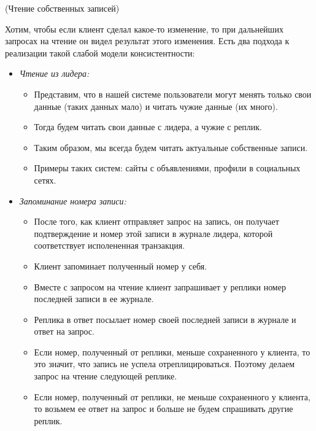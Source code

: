 \begin{example}(Чтение собственных записей)

     Хотим, чтобы если клиент сделал какое-то изменение, то при дальнейших запросах на чтение он видел результат этого изменения. Есть два подхода к реализации такой слабой модели консистентности:
    \begin{itemize}
        \item \textit{Чтение из лидера:}
        \begin{itemize}
            \item Представим, что в нашей системе пользователи могут менять только свои данные (таких данных мало) и читать чужие данные (их много).
            \item Тогда будем читать свои данные с лидера, а чужие с реплик.
            \item Таким образом, мы всегда будем читать актуальные собственные записи.
            \item Примеры таких систем: сайты с объявлениями, профили в социальных сетях.
        \end{itemize}

        \item \textit{Запоминание номера записи:}
        \begin{itemize}
            \item После того, как клиент отправляет запрос на запись, он получает подтверждение и номер этой записи в журнале лидера, которой соответствует исполененная транзакция.
            \item Клиент запоминает полученный номер у себя.
            \item Вместе с запросом на чтение клиент запрашивает у реплики номер последней записи в ее журнале.
            \item Реплика в ответ посылает номер своей последней записи в журнале и ответ на запрос.
            \item Если номер, полученный от реплики, меньше сохраненного у клиента, то это значит, что запись не успела отреплицироваться. Поэтому делаем запрос на чтение следующей реплике.
            \item Если номер, полученный от реплики, не меньше сохраненного у клиента, то возьмем ее ответ на запрос и больше не будем спрашивать другие реплик.
        \end{itemize}

    \end{itemize}

\end{example}
